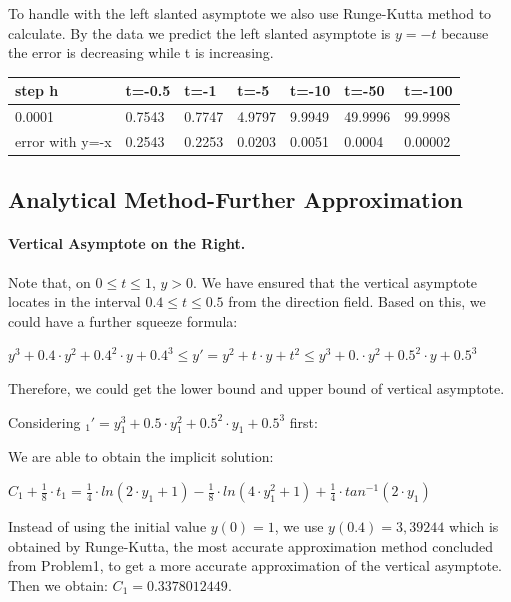 \documentclass[11pt,a4paper]{article}
\begin{document}
To handle with the left slanted asymptote we also use Runge-Kutta method to calculate. By the data we predict the left slanted asymptote is $y=-t$ because the error is decreasing while t is increasing.

\begin{table}[H]
	\centering
	\begin{tabular}{l|l|l|l|l|l|l}
		step h          & t=-0.5 & t=-1   & t=-5   & t=-10  & t=-50   & t=-100  \\ \hline
		0.0001          & 0.7543 & 0.7747 & 4.9797 & 9.9949 & 49.9996 & 99.9998 \\ \hline
		error with y=-x & 0.2543 & 0.2253 & 0.0203 & 0.0051 & 0.0004  & 0.00002 
	\end{tabular}
\end{table}

\subsection{Analytical Method-Further Approximation}
	\paragraph{Vertical Asymptote on the Right.} Note that, on $0 \leq t \leq 1$, $y > 0$. We have ensured that the vertical asymptote locates in the interval $0.4 \leq t \leq 0.5$ from the direction field. Based on this, we could have a further squeeze formula: 
	
	\begin{center}
		$y^3+0.4 \cdot y^2 + 0.4^2 \cdot y + 0.4^3 \leq y' = y^2+t \cdot y + t^2 \leq y^3 + 0. \cdot y^2 + 0.5^2 \cdot y + 0.5^3$
	\end{center}
	
	Therefore, we could get the lower bound and upper bound of vertical asymptote. 
	
	Considering $_1'=y_1^3+0.5 \cdot y_1^2 + 0.5^2 \cdot y_1 + 0.5^3$ first:
	
	We are able to obtain the implicit solution:
	
	\begin{center}
		$C_1+\frac{1}{8} \cdot t_1 = \frac{1}{4} \cdot ln(2 \cdot y_1+1)- \frac{1}{8}\cdot ln(4\cdot y_1^2+1)+\frac{1}{4}\cdot tan^{-1}(2 \cdot y_1)$
	\end{center}
	
	Instead of using the initial value $y(0)=1$, we use $y(0.4)=3,39244$ which is obtained by Runge-Kutta, the most accurate approximation method concluded from Problem1, to get a more accurate approximation of the vertical asymptote. Then we obtain: $C_1=0.3378012449$.
	
\end{document}
